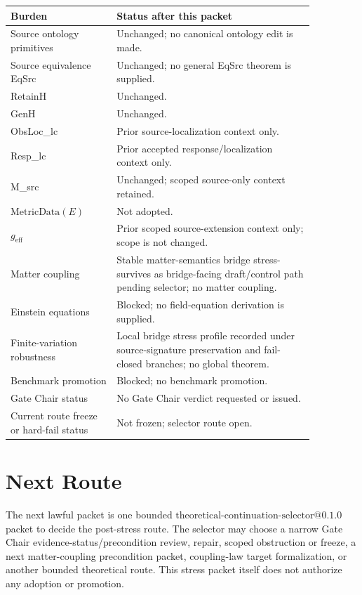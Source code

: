 \documentclass[11pt]{article}
\newcommand{\MetricData}{\mathrm{MetricData}}
\newcommand{\geff}{g_{\mathrm{eff}}}
\begin{document}
\begin{longtable}{p{0.30\linewidth}p{0.56\linewidth}}
\toprule
Burden & Status after this packet \\
\midrule
Source ontology primitives & Unchanged; no canonical ontology edit is made. \\
Source equivalence EqSrc & Unchanged; no general EqSrc theorem is supplied. \\
RetainH & Unchanged. \\
GenH & Unchanged. \\
ObsLoc\_lc & Prior source-localization context only. \\
Resp\_lc & Prior accepted response/localization context only. \\
M\_src & Unchanged; scoped source-only context retained. \\
\(\MetricData(E)\) & Not adopted. \\
\(\geff\) & Prior scoped source-extension context only; scope is not changed. \\
Matter coupling & Stable matter-semantics bridge stress-survives as
bridge-facing draft/control path pending selector; no matter coupling. \\
Einstein equations & Blocked; no field-equation derivation is supplied. \\
Finite-variation robustness & Local bridge stress profile recorded under
source-signature preservation and fail-closed branches; no global theorem. \\
Benchmark promotion & Blocked; no benchmark promotion. \\
Gate Chair status & No Gate Chair verdict requested or issued. \\
Current route freeze or hard-fail status & Not frozen; selector route open. \\
\bottomrule
\end{longtable}

\section{Next Route}

The next lawful packet is one bounded
\(\mathrm{theoretical\mbox{-}continuation\mbox{-}selector@0.1.0}\) packet to
decide the post-stress route. The selector may choose a narrow Gate Chair
evidence-status/precondition review, repair, scoped obstruction or freeze, a
next matter-coupling precondition packet, coupling-law target formalization, or
another bounded theoretical route. This stress packet itself does not authorize
any adoption or promotion.
\end{document}
